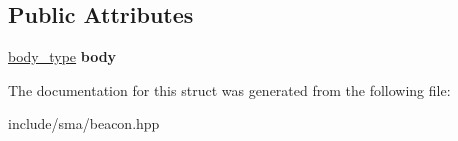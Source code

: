 \subsection*{Public Attributes}
\begin{DoxyCompactItemize}
\item 
\hypertarget{structsma_1_1Beacon_a1dfddd2a8cd3ab94e501d0861b4d0157}{\hyperlink{structsma_1_1Buffer}{body\-\_\-type} {\bfseries body}}\label{structsma_1_1Beacon_a1dfddd2a8cd3ab94e501d0861b4d0157}

\end{DoxyCompactItemize}


The documentation for this struct was generated from the following file\-:\begin{DoxyCompactItemize}
\item 
include/sma/beacon.\-hpp\end{DoxyCompactItemize}
